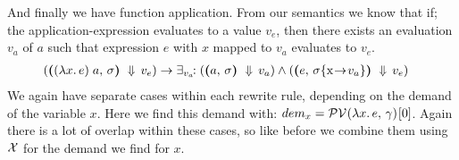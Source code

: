 \documentclass[../main.tex]{subfiles}
\begin{document}
\newpage
And finally we have function application. From our semantics we know that if; the application-expression evaluates to a value $v_e$, then there exists an evaluation $v_a$ of $a$ such that expression $e$ with $x$ mapped to $v_a$ evaluates to $v_e$.
\begin{align*}
    \left( \sempairb{\applyexpr{x}{e}{a}} \DownA v_e \right)
        &\to \exists_{v_a}\hspace{-4pt}: \left( \sempairb{a} \DownA v_a \right)
            \wedge \left( \sempairb[\envmap{\sigma}{x}{v_a}]{e} \DownA v_e \right)
\end{align*}
%
We again have separate cases within each rewrite rule, depending on the demand of the variable $x$. Here we find this demand with: $dem_x = \mathcal{PV}\hspace{-1.2pt} \left( \lambda x.\, e,\, \gamma \right) \hspace{-1pt}[0]$. Again there is a lot of overlap within these cases, so like before we combine them using $\mathcal{X}$ for the demand we find for $x$.
\end{document}
